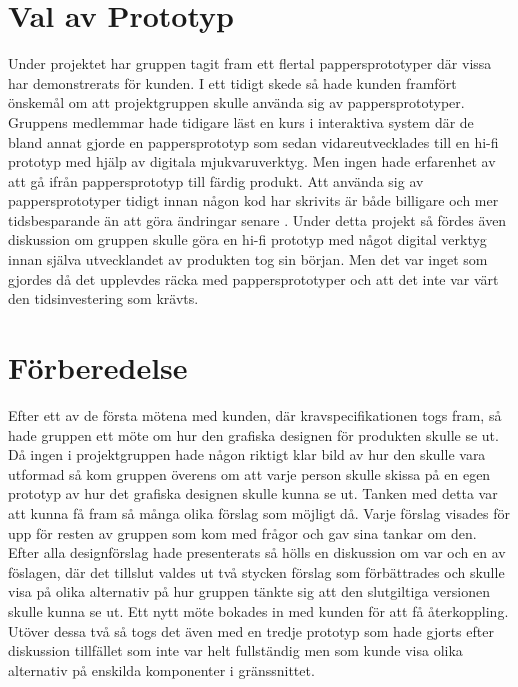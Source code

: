 \section{Val av Prototyp} 
Under projektet har gruppen tagit fram ett flertal pappersprototyper där vissa  har demonstrerats för kunden. I ett tidigt skede så hade kunden framfört önskemål om att projektgruppen skulle använda sig av pappersprototyper. Gruppens medlemmar hade tidigare läst en kurs i interaktiva system där de bland annat gjorde en pappersprototyp som sedan vidareutvecklades till en hi-fi prototyp med hjälp av digitala mjukvaruverktyg. Men ingen hade erfarenhet av att gå ifrån pappersprototyp till färdig produkt. Att använda sig av pappersprototyper tidigt innan någon kod har skrivits är både billigare och mer tidsbesparande än att göra ändringar senare \cite{paper}. Under detta projekt så fördes även diskussion om gruppen skulle göra en hi-fi prototyp med något digital verktyg innan själva utvecklandet av produkten tog sin början. Men det var inget som gjordes då det upplevdes räcka med pappersprototyper och att det inte var värt den tidsinvestering som krävts.      

\section{Förberedelse}
Efter ett av de första mötena med kunden, där kravspecifikationen togs fram, så hade gruppen ett möte om hur den grafiska designen för produkten  skulle se ut. Då ingen i projektgruppen hade någon riktigt klar bild av hur den skulle vara utformad så kom gruppen överens om att varje person skulle skissa på en egen prototyp av hur det grafiska designen skulle kunna se ut. Tanken med detta var att kunna få fram så många olika förslag som möjligt då. Varje förslag visades för upp för resten av gruppen som kom med frågor och gav sina tankar om den. Efter alla designförslag hade presenterats så hölls en diskussion om var och en av föslagen, där det tillslut valdes ut två stycken förslag som förbättrades och skulle visa på olika alternativ på hur gruppen tänkte sig att den slutgiltiga versionen skulle kunna se ut. Ett nytt möte bokades in med kunden för att få återkoppling. Utöver dessa två så togs det även med en tredje prototyp som hade gjorts efter diskussion tillfället som inte var helt fullständig men som kunde visa olika alternativ på enskilda komponenter i gränssnittet.

